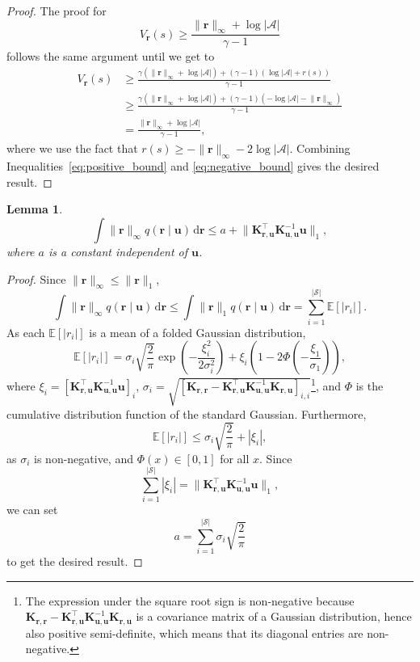 \documentclass{mpaper}
\newtheorem{lemma}[theorem]{Lemma}
\newcommand{\V}{V_{\mathbf{r}}}
\newcommand{\rinf}{\lVert \mathbf{r} \rVert_\infty}
\newcommand{\Kuu}{\mathbf{K}_{\mathbf{u},\mathbf{u}}}
\newcommand{\Krr}{\mathbf{K}_{\mathbf{r},\mathbf{r}}}
\newcommand{\Kru}{\mathbf{K}_{\mathbf{r},\mathbf{u}}}
\begin{document}
\begin{proof}
  The proof for
  \begin{equation} \label{eq:negative_bound}
    \V(s) \ge \frac{\rinf + \log|\mathcal{A}|}{\gamma - 1}
  \end{equation}
  follows the same argument until we get to
  \begin{align*}
    \V(s) &\ge \frac{\gamma(\rinf + \log|\mathcal{A}|) + (\gamma - 1)(\log|\mathcal{A}| + r(s))}{\gamma - 1} \\
          &\ge \frac{\gamma(\rinf + \log|\mathcal{A}|) + (\gamma - 1)(-\log|\mathcal{A}| -\rinf)}{\gamma - 1} \\
          &= \frac{\rinf + \log|\mathcal{A}|}{\gamma - 1},
  \end{align*}
  where we use the fact that $r(s) \ge -\rinf - 2\log|\mathcal{A}|$. Combining
  Inequalities~\eqref{eq:positive_bound} and \eqref{eq:negative_bound} gives
  the desired result.
\end{proof}

\begin{lemma} \label{lemma:integral_of_r}
  \[
    \int \lVert \mathbf{r} \rVert_\infty q(\mathbf{r} \mid
    \mathbf{u})\,\mathrm{d}\mathbf{r} \le a + \lVert \Kru^\intercal \Kuu^{-1}
    \mathbf{u} \rVert_1,
  \]
  where $a$ is a constant independent of $\mathbf{u}$.
\end{lemma}
\begin{proof}
  Since $\rinf \le \lVert \mathbf{r} \rVert_1$,
  \[
    \int \lVert \mathbf{r} \rVert_\infty q(\mathbf{r} \mid
    \mathbf{u})\,\mathrm{d}\mathbf{r} \le \int \lVert \mathbf{r} \rVert_1
    q(\mathbf{r} \mid \mathbf{u})\,\mathrm{d}\mathbf{r} =
    \sum_{i=1}^{|\mathcal{S}|} \mathbb{E}[|r_i|].
  \]
  As each $\mathbb{E}[|r_i|]$ is a mean of a folded Gaussian distribution,
  \[
    \mathbb{E}[|r_i|] = \sigma_i \sqrt{\frac{2}{\pi}} \exp
    \left(-\frac{\xi_i^2}{2\sigma_i^2} \right) + \xi_i \left( 1 - 2\Phi \left(
        -\frac{\xi_1}{\sigma_1} \right) \right),
  \]
  where $\xi_i = \left[\Kru^\intercal\Kuu^{-1}\mathbf{u}\right]_i$, $\sigma_i =
  \sqrt{[\Krr - \Kru^\intercal\Kuu^{-1}\Kru]_{i,i}}$\footnote{The expression
    under the square root sign is non-negative because $\Krr -
    \Kru^\intercal\Kuu^{-1}\Kru$ is a covariance matrix of a Gaussian
    distribution, hence also positive semi-definite, which means that its
    diagonal entries are non-negative.}, and $\Phi$ is the cumulative
  distribution function of the standard Gaussian. Furthermore,
  \[
    \mathbb{E}[|r_i|] \le \sigma_i\sqrt{\frac{2}{\pi}} + |\xi_i|,
  \]
  as $\sigma_i$ is non-negative, and $\Phi(x) \in [0, 1]$ for all $x$. Since
  \[ \sum_{i=1}^{|\mathcal{S}|} |\xi_i| = \lVert \Kru^\intercal \Kuu^{-1}
    \mathbf{u} \rVert_1, \]
  we can set
  \[ a = \sum_{i=1}^{|\mathcal{S}|} \sigma_i \sqrt{\frac{2}{\pi}} \]
  to get the desired result.
\end{proof}
\end{document}
